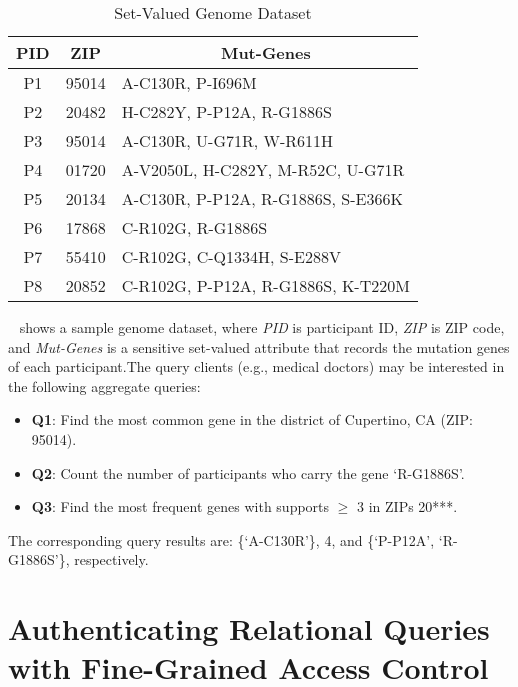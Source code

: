 \begin{table}[t]
  \centering
  \begin{tabular}{ccl}
    \toprule
    \textbf{PID} & \textbf{ZIP} & \multicolumn{1}{c}{\textbf{Mut-Genes}}\\
    \midrule
    P1&95014&A-C130R, P-I696M\\
    P2&20482&H-C282Y, P-P12A, R-G1886S \\
    P3&95014&A-C130R, U-G71R, W-R611H\\
    P4&01720&A-V2050L, H-C282Y, M-R52C, U-G71R\\
    P5&20134&A-C130R, P-P12A, R-G1886S, S-E366K\\
    P6&17868& C-R102G, R-G1886S\\
    P7&55410&C-R102G, C-Q1334H, S-E288V\\
    P8&20852&C-R102G, P-P12A, R-G1886S, K-T220M\\
    \bottomrule
  \end{tabular}
  \caption{Set-Valued Genome Dataset}\label{tab:intro:sample_pgp}
\end{table}

\begin{example}~\label{example:intro:pgp}
   shows a sample genome dataset, where \emph{PID} is participant ID, \emph{ZIP} is ZIP code, and \emph{Mut-Genes} is a sensitive set-valued attribute that records the mutation genes of each participant.The query clients (e.g., medical doctors) may be interested in the following aggregate queries:
    \begin{itemize}[noitemsep]
      \item \textbf{Q1}: Find the most common gene in the district of Cupertino, CA (ZIP\@: 95014).
      \item \textbf{Q2}: Count the number of participants who carry the gene `R-G1886S'.
      \item \textbf{Q3}: Find the most frequent genes with supports $\ge$ 3 in ZIPs 20***.
    \end{itemize}
    The corresponding query results are: \{`A-C130R'\}, 4, and \{`P-P12A', `R-G1886S'\}, respectively.
\end{example}

\section{Authenticating Relational Queries with Fine-Grained Access Control}

